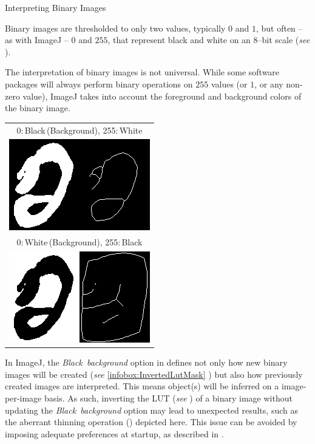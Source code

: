 \begin{infobox}
{\small \caption{\label{infobox:blackBackground}Interpreting Binary Images}
}{\small \par}

Binary images are thresholded to only two values, typically $0$ and
$1$, but often -- as with ImageJ -- $0$ and $255$, that represent
black and white on an 8--bit scale (\emph{see} ).\medskip{}


The interpretation of binary images is not universal. While some software
packages will always perform binary operations on $255$ values (or
$1$, or any non-zero value), ImageJ takes into account the foreground
and background colors of the binary image.\medskip{}


{\small }%
\begin{minipage}[c][1\totalheight][t]{0.34\columnwidth}%
{\small \hspace*{-6pt}}%
\begin{tabular}{c}
{\scriptsize 0:\,Black\,(Background), 255:\,White}\tabularnewline
{\small \includegraphics[scale=0.55]{images/BlackBackgroundAffect1}}\tabularnewline
{\scriptsize 0:\,White\,(Background), 255:\,Black}\tabularnewline
{\small \includegraphics[scale=0.55]{images/BlackBackgroundAffect2}}\tabularnewline
\end{tabular}%
\end{minipage}{\small }%
\begin{minipage}[c][1\totalheight][t]{0.66\columnwidth}%
In ImageJ, the \emph{Black\ background }option in\emph{ }
defines not only how new binary images will be created (\emph{see}
\ref{infobox:InvertedLutMask} )
but also how previously created images are interpreted. This means
object(s) will be inferred on a image-per-image basis. As such, inverting
the LUT (\emph{see} ) of a binary image without
updating the \emph{Black\ background} option may lead to unexpected
results, such as the aberrant thinning operation ()
depicted here. This issue can be avoided by imposing adequate preferences
at startup, as described in .


\end{minipage}
\end{infobox}
